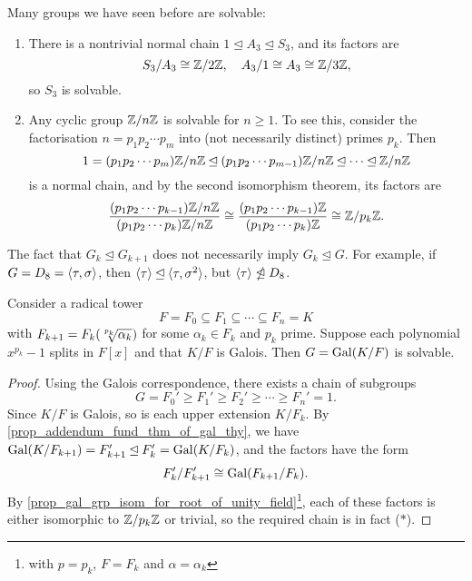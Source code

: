 \begin{example}
\label{exmp_solvable_groups}
    Many groups we have seen before are solvable:
    \begin{enumerate}
        \item 
        There is a nontrivial normal chain $1 \unlhd A_3 \unlhd S_3$, and its factors are
        \[
            S_3/A_3 \cong \mathbb{{Z}}/{{2}}\mathbb{{Z}}, \quad A_3/1 \cong A_3 \cong \mathbb{{Z}}/{{3}}\mathbb{{Z}},
        \]
        so $S_3$ is solvable.
        
        \item Any cyclic group $\mathbb{{Z}}/{{n}}\mathbb{{Z}}$ is solvable for $n \geq 1$. To see this, consider the factorisation $n = p_1 p_2 \cdots p_m$ into (not necessarily distinct) primes $p_k$. Then
        \[
            1 = (p_1 p_2 \cdots p_m) \mathbb{{Z}}/{{n}}\mathbb{{Z}} \unlhd (p_1 p_2 \cdots p_{m - 1}) \mathbb{{Z}}/{{n}}\mathbb{{Z}} \unlhd \cdots \unlhd \mathbb{{Z}}/{{n}}\mathbb{{Z}}
        \]
        is a normal chain, and by the second isomorphism theorem, its factors are
        \[
            \frac{(p_1 p_2 \cdots p_{k - 1}) \mathbb{{Z}}/{{n}}\mathbb{{Z}}}{(p_1 p_2 \cdots p_k) \mathbb{{Z}}/{{n}}\mathbb{{Z}}} \cong \frac{(p_1 p_2 \cdots p_{k - 1}) \mathbb{{Z}}}{(p_1 p_2 \cdots p_k) \mathbb{{Z}}} \cong \mathbb{{Z}}/{{p_k}}\mathbb{{Z}}. \qedhere
        \]
    \end{enumerate}
\end{example}

\begin{remark}
    The fact that $G_k \unlhd G_{k + 1}$ does not necessarily imply $G_k \unlhd G$. For example, if $G = D_8 = \langle {\tau, \sigma} \rangle$, then $\langle {\tau} \rangle \unlhd \langle {\tau, \sigma^2} \rangle$, but $\langle {\tau} \rangle \ntrianglelefteq D_8$.
\end{remark}

\begin{theorem}
    Consider a radical tower
    \[
        F = F_0 \subseteq F_1 \subseteq \cdots \subseteq F_n = K
    \]
    with $F_{k + 1} = F_k(\sqrt[\uproot{3} p_k]{\alpha_k})$ for some $\alpha_k \in F_k$ and $p_k$ prime. Suppose each polynomial $x^{p_k} - 1$ splits in $F[x]$ and that $K/F$ is Galois. Then $G = \operatorname{Gal}(K/F)$ is solvable.
\end{theorem}

\begin{proof}
    Using the Galois correspondence, there exists a chain of subgroups
    \[
        G = F_0' \geq F_1' \geq F_2' \geq \cdots \geq F_n' = 1. \tag{$*$}
    \]
    Since $K/F$ is Galois, so is each upper extension $K/F_k$. By \cref{prop_addendum_fund_thm_of_gal_thy}, we have $\operatorname{Gal}(K/F_{k + 1}) = F_{k + 1}' \unlhd F_k' = \operatorname{Gal}(K/F_k)$, and the factors have the form
    \[
        F_k'/F_{k + 1}' \cong \operatorname{Gal}(F_{k + 1}/F_k).
    \]
    By \cref{prop_gal_grp_isom_for_root_of_unity_field}\footnote{with $p = p_k$, $F = F_k$ and $\alpha = \alpha_k$}, each of these factors is either isomorphic to $\mathbb{{Z}}/{{p_k}}\mathbb{{Z}}$ or trivial, so the required chain is in fact ($*$).
\end{proof}

